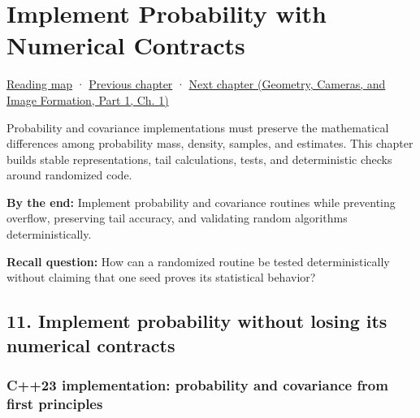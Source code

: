 \chapter{Implement Probability with Numerical Contracts}\label{02-foundations-ii-ch031-implement-probability-with-numerical-contracts}\hypertarget{02-foundations-ii-ch031}{}\label{stagechapter:02-foundations-ii-ch031}

\hypertarget{02-foundations-ii-ch031-implement-probability-with-numerical-contracts}{}

\hyperref[volume-reading-map]{Reading map} · \hyperref[02-foundations-ii-ch030-monte-carlo-estimates-and-uncertainty-metrics]{Previous chapter} · \href{../03-Geometry-Cameras-and-Image-Formation-P01/main.pdf\#nameddest=02-foundations-ii-ch032-geometry-becomes-an-image-and-an-inverse-problem}{Next chapter (Geometry, Cameras, and Image Formation, Part 1, Ch. 1)}

Probability and covariance implementations must preserve the mathematical differences among probability mass, density, samples, and estimates. This chapter builds stable representations, tail calculations, tests, and deterministic checks around randomized code.

\textbf{By the end:} Implement probability and covariance routines while preventing overflow, preserving tail accuracy, and validating random algorithms deterministically.

\textbf{Recall question:} How can a randomized routine be tested deterministically without claiming that one seed proves its statistical behavior?

\section{11. Implement probability without losing its numerical contracts}\label{02-foundations-ii-ch031-implement-probability-without-losing-its-numerical-contracts}

\hypertarget{02-foundations-ii-ch031-implement-probability-without-losing-its-numerical-contracts}{}

\subsection{C++23 implementation: probability and covariance from first principles}\label{02-foundations-ii-ch031-c23-implementation-probability-and-covariance-from-first-principles}

\hypertarget{02-foundations-ii-ch031-c23-implementation-probability-and-covariance-from-first-principles}{}

